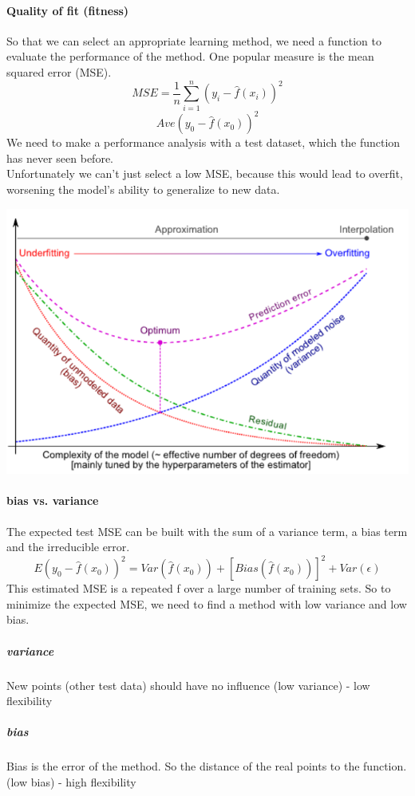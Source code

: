 \documentclass[../document.tex]{subfiles}
\begin{document}
	\paragraph{Quality of fit (fitness)}
	So that we can select an appropriate learning method, we need a function to evaluate the performance of the method. One popular measure is the mean squared error (MSE).
	\begin{equation}
	MSE = \frac{1}{n}\sum_{i=1}^{n} (y_{i}-\hat{f}(x_{i}))^2
	\end{equation}
	\begin{equation}
	Ave(y_{0}-\hat{f}(x_{0}))^2
	\end{equation}
	We need to make a performance analysis with a test dataset, which the function has never seen before.\\
	Unfortunately we can't just select a low MSE, because this would lead to overfit, worsening the model's ability to generalize to new data.\\
	\begin{center}
		\includegraphics[width=.7\textwidth]{pictures/variance_bias_tradeoff.png}
	\end{center}


	\paragraph{bias vs. variance}
	The expected test MSE can be built with the sum of a variance term, a bias term and the irreducible error.
	\begin{equation}
	E(y_{0}-\hat{f}(x_{0}))^2 = Var(\hat{f}(x_{0})) + [Bias(\hat{f}(x_{0}))]^2 + Var(\epsilon)
	\end{equation}
	This estimated MSE is a repeated f over a large number of training sets. So to minimize the expected MSE, we need to find a method with low variance and low bias.\\
	\subparagraph{variance}
	New points (other test data) should have no influence (low variance) - low flexibility
	\subparagraph{bias}
	Bias is the error of the method. So the distance of the real points to the function. (low bias) - high flexibility
\end{document}
